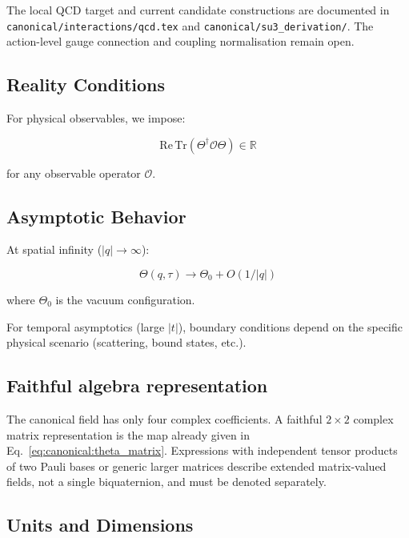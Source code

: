 The local QCD target and current candidate constructions are documented in \texttt{canonical/interactions/qcd.tex} and \texttt{canonical/su3\_derivation/}. The action-level gauge connection and coupling normalisation remain open.

\subsection{Reality Conditions}

For physical observables, we impose:

\begin{equation}
\label{eq:canonical:theta_reality}
\text{Re}\,\text{Tr}(\Theta^\dagger \mathcal{O} \Theta) \in \mathbb{R}
\end{equation}

for any observable operator $\mathcal{O}$.

\subsection{Asymptotic Behavior}

At spatial infinity ($|q| \to \infty$):

\begin{equation}
\label{eq:canonical:theta_asymptotics}
\Theta(q,\tau) \to \Theta_0 + O(1/|q|)
\end{equation}

\noindent where $\Theta_0$ is the vacuum configuration.

For temporal asymptotics (large $|t|$), boundary conditions depend on the specific physical scenario (scattering, bound states, etc.).

\subsection{Faithful algebra representation}

The canonical field has only four complex coefficients. A faithful
$2\times2$ complex matrix representation is the map already given in
Eq.~\eqref{eq:canonical:theta_matrix}. Expressions with independent tensor
products of two Pauli bases or generic larger matrices describe extended
matrix-valued fields, not a single biquaternion, and must be denoted
separately.

\subsection{Units and Dimensions}

